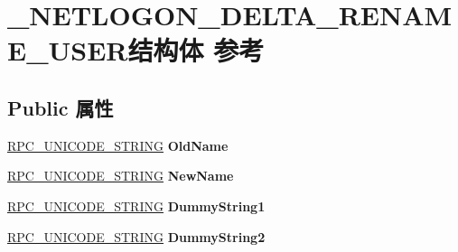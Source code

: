\hypertarget{struct___n_e_t_l_o_g_o_n___d_e_l_t_a___r_e_n_a_m_e___u_s_e_r}{}\section{\+\_\+\+N\+E\+T\+L\+O\+G\+O\+N\+\_\+\+D\+E\+L\+T\+A\+\_\+\+R\+E\+N\+A\+M\+E\+\_\+\+U\+S\+E\+R结构体 参考}
\label{struct___n_e_t_l_o_g_o_n___d_e_l_t_a___r_e_n_a_m_e___u_s_e_r}
\subsection*{Public 属性}
\begin{DoxyCompactItemize}
\item 
\mbox{\label{struct___n_e_t_l_o_g_o_n___d_e_l_t_a___r_e_n_a_m_e___u_s_e_r_ad0547d1d475651aff9206e0194ced4f1}} 
\hyperlink{struct___r_p_c___u_n_i_c_o_d_e___s_t_r_i_n_g}{R\+P\+C\+\_\+\+U\+N\+I\+C\+O\+D\+E\+\_\+\+S\+T\+R\+I\+NG} {\bfseries Old\+Name}
\item 
\mbox{\label{struct___n_e_t_l_o_g_o_n___d_e_l_t_a___r_e_n_a_m_e___u_s_e_r_a58ebf1b1950ede80984ecee12cfde061}} 
\hyperlink{struct___r_p_c___u_n_i_c_o_d_e___s_t_r_i_n_g}{R\+P\+C\+\_\+\+U\+N\+I\+C\+O\+D\+E\+\_\+\+S\+T\+R\+I\+NG} {\bfseries New\+Name}
\item 
\mbox{\label{struct___n_e_t_l_o_g_o_n___d_e_l_t_a___r_e_n_a_m_e___u_s_e_r_a93222d966efa604c7b398d55b0b61cc8}} 
\hyperlink{struct___r_p_c___u_n_i_c_o_d_e___s_t_r_i_n_g}{R\+P\+C\+\_\+\+U\+N\+I\+C\+O\+D\+E\+\_\+\+S\+T\+R\+I\+NG} {\bfseries Dummy\+String1}
\item 
\mbox{\label{struct___n_e_t_l_o_g_o_n___d_e_l_t_a___r_e_n_a_m_e___u_s_e_r_a03a9b7b2d4d6a901f28ebc7abefacc1c}} 
\hyperlink{struct___r_p_c___u_n_i_c_o_d_e___s_t_r_i_n_g}{R\+P\+C\+\_\+\+U\+N\+I\+C\+O\+D\+E\+\_\+\+S\+T\+R\+I\+NG} {\bfseries Dummy\+String2}
\item 
\mbox{\label{struct___n_e_t_l_o_g_o_n___d_e_l_t_a___r_e_n_a_m_e___u_s_e_r_a8136b40ee2919571c5ead475ed965a08}} 

\end{DoxyCompactItemize}
